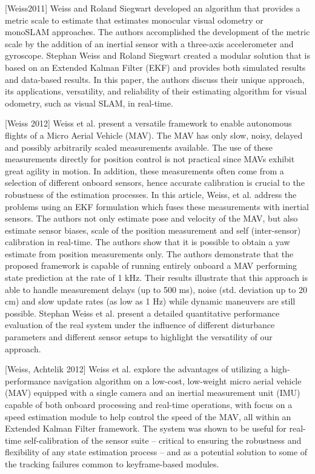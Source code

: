 [Weiss2011] Weiss and Roland Siegwart developed an algorithm that provides a metric scale to estimate that estimates monocular visual odometry or monoSLAM approaches. The authors accomplished the development of the metric scale by the addition of an inertial sensor with a three-axis accelerometer and gyroscope. Stephan Weiss and Roland Siegwart created a modular solution that is based on an Extended Kalman Filter (EKF) and provides both simulated results and data-based results. In this paper, the authors discuss their unique approach, its applications, versatility, and reliability of their estimating algorithm for visual odometry, such as visual SLAM, in real-time. 

[Weiss 2012] Weiss et al. present a versatile framework to enable autonomous flights of a Micro Aerial Vehicle (MAV). The MAV has only slow, noisy, delayed and possibly arbitrarily scaled measurements available. The use of these measurements directly for position control is not practical since MAVs exhibit great agility in motion. In addition, these measurements often come from a selection of different onboard sensors, hence accurate calibration is crucial to the robustness of the estimation processes. In this article, Weiss, et al. address the problems using an EKF formulation which fuses these measurements with inertial sensors. The authors not only estimate pose and velocity of the MAV, but also estimate sensor biases, scale of the position measurement and self (inter-sensor) calibration in real-time. The authors show that it is possible to obtain a yaw estimate from position measurements only. The authors demonstrate that the proposed framework is capable of running entirely onboard a MAV performing state prediction at the rate of 1 kHz. Their results illustrate that this approach is able to handle measurement delays (up to 500 ms), noise (std. deviation up to 20 cm) and slow update rates (as low as 1 Hz) while dynamic maneuvers are still possible. Stephan Weiss et al. present a detailed quantitative performance evaluation of the real system under the influence of different disturbance parameters and different sensor setups to highlight the versatility of our approach. 

[Weiss, Achtelik 2012] Weiss et al. explore the advantages of utilizing a high-performance navigation algorithm on a low-cost, low-weight micro aerial vehicle (MAV) equipped with a single camera and an inertial measurement unit (IMU) capable of both onboard processing and real-time operations, with focus on a speed estimation module to help control the speed of the MAV, all within an Extended Kalman Filter framework. The system was shown to be useful for real-time self-calibration of the sensor suite – critical to ensuring the robustness and flexibility of any state estimation process – and as a potential solution to some of the tracking failures common to keyframe-based modules. 

